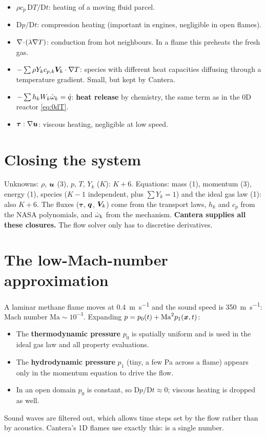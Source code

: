 \begin{intuition}
\begin{itemize}
  \item $\rho c_p\,\mathrm DT/\mathrm Dt$: heating of a moving fluid parcel.
  \item $\mathrm Dp/\mathrm Dt$: compression heating (important in engines, negligible in open flames).
  \item $\nabla\!\cdot\!(\lambda\nabla T)$: conduction from hot neighbours. In a flame this preheats the fresh gas.
  \item $-\sum\rho Y_kc_{p,k}\bm{V}_k\cdot\nabla T$: species with different heat capacities diffusing
        through a temperature gradient. Small, but kept by Cantera.
  \item $-\sum h_kW_k\dot{\omega}_k=\dot q$: \textbf{heat release} by chemistry, the same term as in the 0D reactor
        \eqref{eq:0dT}.
  \item $\bm\tau:\nabla\bm{u}$: viscous heating, negligible at low speed.
\end{itemize}
\end{intuition}

\section{Closing the system}

Unknowns: $\rho$, $\bm{u}$ (3), $p$, $T$, $Y_k$ ($K$): $K+6$. Equations: mass (1), momentum (3),
energy (1), species ($K-1$ independent, plus $\sum Y_k=1$) and the ideal gas law (1): also $K+6$.
The fluxes ($\bm\tau$, $\bm{q}$, $\bm{V}_k$) come from the transport laws, $h_k$ and $c_p$ from the NASA
polynomials, and $\dot{\omega}_k$ from the mechanism. \textbf{Cantera supplies all these closures.} The
flow solver only has to discretise derivatives.

\section{The low-Mach-number approximation}
\label{sec:lowmach}

A laminar methane flame moves at \SI{0.4}{\metre\per\second} and the sound speed is
\SI{350}{\metre\per\second}: Mach number $\mathrm{Ma}\sim10^{-3}$. Expanding $p=p_0(t)+\mathrm{Ma}^2p_1(\bm{x},t)$:
\begin{itemize}
  \item The \textbf{thermodynamic pressure} $p_0$ is spatially uniform and is used in the ideal gas law
        and all property evaluations.
  \item The \textbf{hydrodynamic pressure} $p_1$ (tiny, a few Pa across a flame) appears only in the
        momentum equation to drive the flow.
  \item In an open domain $p_0$ is constant, so $\mathrm Dp/\mathrm Dt\approx0$; viscous heating is
        dropped as well.
\end{itemize}
Sound waves are filtered out, which allows time steps set by the flow rather than by acoustics.
Cantera's 1D flames use exactly this:  is a single number.

